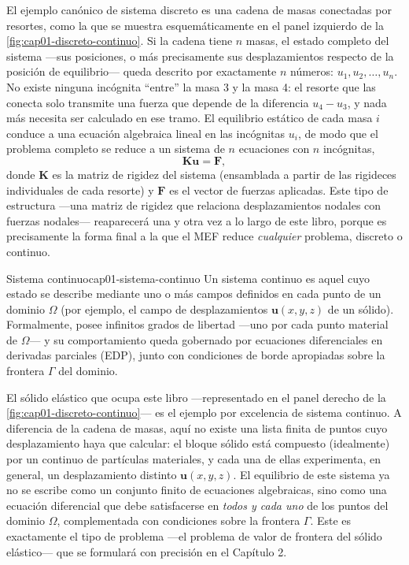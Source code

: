 El ejemplo canónico de sistema discreto es una cadena de masas conectadas por resortes, como la que se muestra esquemáticamente en el panel izquierdo de la \cref{fig:cap01-discreto-continuo}. Si la cadena tiene $n$ masas, el estado completo del sistema —sus posiciones, o más precisamente sus desplazamientos respecto de la posición de equilibrio— queda descrito por exactamente $n$ números: $u_1, u_2, \dots, u_n$. No existe ninguna incógnita ``entre'' la masa 3 y la masa 4: el resorte que las conecta solo transmite una fuerza que depende de la diferencia $u_4-u_3$, y nada más necesita ser calculado en ese tramo. El equilibrio estático de cada masa $i$ conduce a una ecuación algebraica lineal en las incógnitas $u_i$, de modo que el problema completo se reduce a un sistema de $n$ ecuaciones con $n$ incógnitas,
\[
\mathbf{K}\mathbf{u} = \mathbf{F},
\]
donde $\mathbf{K}$ es la matriz de rigidez del sistema (ensamblada a partir de las rigideces individuales de cada resorte) y $\mathbf{F}$ es el vector de fuerzas aplicadas. Este tipo de estructura —una matriz de rigidez que relaciona desplazamientos nodales con fuerzas nodales— reaparecerá una y otra vez a lo largo de este libro, porque es precisamente la forma final a la que el MEF reduce \emph{cualquier} problema, discreto o continuo.

\begin{definicion}{Sistema continuo}{cap01-sistema-continuo}
Un sistema continuo es aquel cuyo estado se describe mediante uno o más campos definidos en cada punto de un dominio $\Omega$ (por ejemplo, el campo de desplazamientos $\bm{u}(x,y,z)$ de un sólido). Formalmente, posee infinitos grados de libertad —uno por cada punto material de $\Omega$— y su comportamiento queda gobernado por ecuaciones diferenciales en derivadas parciales (EDP), junto con condiciones de borde apropiadas sobre la frontera $\Gamma$ del dominio.
\end{definicion}

El sólido elástico que ocupa este libro —representado en el panel derecho de la \cref{fig:cap01-discreto-continuo}— es el ejemplo por excelencia de sistema continuo. A diferencia de la cadena de masas, aquí no existe una lista finita de puntos cuyo desplazamiento haya que calcular: el bloque sólido está compuesto (idealmente) por un continuo de partículas materiales, y cada una de ellas experimenta, en general, un desplazamiento distinto $\bm{u}(x,y,z)$. El equilibrio de este sistema ya no se escribe como un conjunto finito de ecuaciones algebraicas, sino como una ecuación diferencial que debe satisfacerse en \emph{todos y cada uno} de los puntos del dominio $\Omega$, complementada con condiciones sobre la frontera $\Gamma$. Este es exactamente el tipo de problema —el problema de valor de frontera del sólido elástico— que se formulará con precisión en el Capítulo 2.


